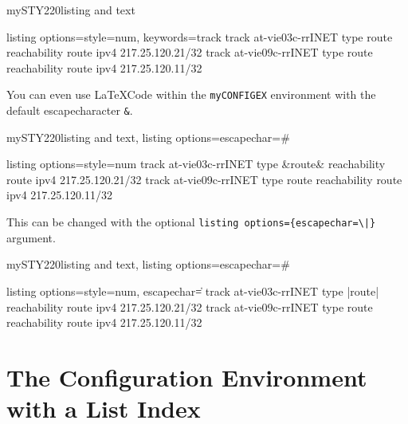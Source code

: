 \documentclass[]{myHOWTO-V001}
\begin{document}
\begin{myTEXEXdoclst}{mySTY220}{listing and text}
\begin{myCONFIGEX}{listing options={style=num, keywords={track}}}
track at-vie03c-rrINET type route reachability route ipv4 217.25.120.21/32
track at-vie09c-rrINET type route reachability route ipv4 217.25.120.11/32
\end{myCONFIGEX}
\end{myTEXEXdoclst}

You can even use \LaTeX Code within the \Verb|myCONFIGEX| environment with the default escapecharacter \Verb|&|.

\begin{myTEXEXdoclst}{mySTY220}{listing and text, listing options={escapechar=\#}}
\begin{myCONFIGEX}{listing options={style=num}}
track at-vie03c-rrINET type &{\color{red}route}& reachability route ipv4 217.25.120.21/32
track at-vie09c-rrINET type route reachability route ipv4 217.25.120.11/32
\end{myCONFIGEX}
\end{myTEXEXdoclst}

\DefineShortVerb{\#}

This can be changed with the optional \verb#listing options={escapechar=\|}# argument.

\begin{myTEXEXdoclst}{mySTY220}{listing and text, listing options={escapechar=\#}}
\begin{myCONFIGEX}{listing options={style=num, escapechar=\|}}
track at-vie03c-rrINET type |{\color{red}route}| reachability route ipv4 217.25.120.21/32
track at-vie09c-rrINET type route reachability route ipv4 217.25.120.11/32
\end{myCONFIGEX}
\end{myTEXEXdoclst}

%
%

\section{The Configuration Environment with a List Index}
\end{document}
